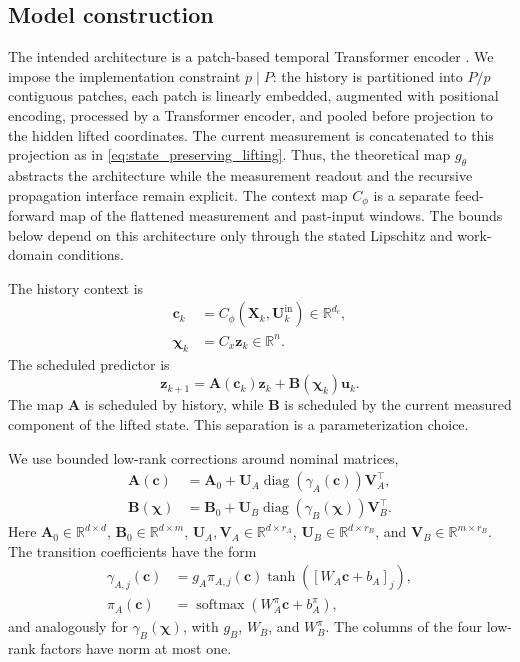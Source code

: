 \documentclass[journal]{IEEEtran}
\newcommand{\vu}{\mathbf{u}}
\newcommand{\vz}{\mathbf{z}}
\newcommand{\vc}{\mathbf{c}}
\newcommand{\vchi}{\boldsymbol{\chi}}
\newcommand{\mA}{\mathbf{A}}
\newcommand{\mB}{\mathbf{B}}
\newcommand{\mU}{\mathbf{U}}
\newcommand{\mV}{\mathbf{V}}
\newcommand{\mX}{\mathbf{X}}
\newcommand{\R}{\mathbb{R}}
\begin{document}
\subsection{Model construction}

The intended architecture is a patch-based temporal Transformer encoder \cite{vaswani2017attention,nie2023time}. We impose the implementation constraint $p\mid P$: the history is partitioned into $P/p$ contiguous patches, each patch is linearly embedded, augmented with positional encoding, processed by a Transformer encoder, and pooled before projection to the hidden lifted coordinates. The current measurement is concatenated to this projection as in \eqref{eq:state_preserving_lifting}. Thus, the theoretical map $g_\theta$ abstracts the architecture while the measurement readout and the recursive propagation interface remain explicit. The context map $C_\phi$ is a separate feed-forward map of the flattened measurement and past-input windows. The bounds below depend on this architecture only through the stated Lipschitz and work-domain conditions.

The history context is
\begin{align}
    \vc_k&=C_\phi(\mX_k,\mU_k^{\mathrm{in}})\in\R^{d_c},
    \label{eq:history_context}\\
    \vchi_k&=C_x\vz_k\in\R^n.
    \label{eq:scheduling_variables}
\end{align}
The scheduled predictor is
\begin{equation}
    \vz_{k+1}=\mA(\vc_k)\vz_k+\mB(\vchi_k)\vu_k.
    \label{eq:scheduled_predictor}
\end{equation}
The map $\mA$ is scheduled by history, while $\mB$ is scheduled by the current measured component of the lifted state. This separation is a parameterization choice.

We use bounded low-rank corrections around nominal matrices,
\begin{align}
    \mA(\vc)&=\mA_0+\mU_A\operatorname{diag}(\gamma_A(\vc))\mV_A^\top,
    \label{eq:transition_schedule}\\
    \mB(\vchi)&=\mB_0+\mU_B\operatorname{diag}(\gamma_B(\vchi))\mV_B^\top.
    \label{eq:low_rank_schedules}
\end{align}
Here $\mA_0\in\R^{d\times d}$, $\mB_0\in\R^{d\times m}$, $\mU_A,\mV_A\in\R^{d\times r_A}$, $\mU_B\in\R^{d\times r_B}$, and $\mV_B\in\R^{m\times r_B}$. The transition coefficients have the form
\begin{align}
    \gamma_{A,j}(\vc)&=g_A\pi_{A,j}(\vc)\tanh([W_A\vc+b_A]_j),
    \label{eq:A_modulation_coefficients}\\
    \pi_A(\vc)&=\operatorname{softmax}(W_A^\pi\vc+b_A^\pi),
    \label{eq:A_modulation}
\end{align}
and analogously for $\gamma_B(\vchi)$, with $g_B$, $W_B$, and $W_B^\pi$. The columns of the four low-rank factors have norm at most one.
\end{document}
